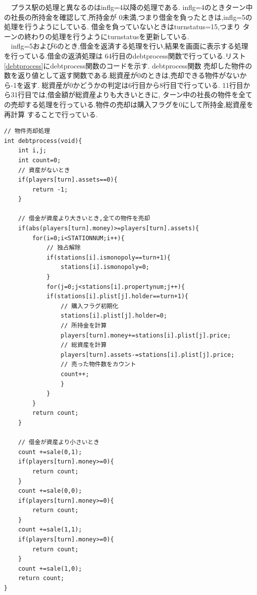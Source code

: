\documentclass[a4j]{jarticle}
\begin{document}
        　プラス駅の処理と異なるのはinflg=4以降の処理である. inflg=4のときターン中の社長の所持金を確認して,所持金が
        0未満,つまり借金を負ったときは,inflg=5の処理を行うようにしている. 借金を負っていないときはturnstatus=15,つまり
        ターンの終わりの処理を行うようにturnstatusを更新している.\\
        　inflg=5および6のとき,借金を返済する処理を行い,結果を画面に表示する処理を行っている.借金の返済処理は
        64行目のdebtprocess関数で行っている.リスト\ref{debtprocess}にdebtprocess関数のコードを示す. debtprocess関数
        売却した物件の数を返り値として返す関数である.総資産が0のときは,売却できる物件がないから-1を返す.
        総資産が0かどうかの判定は6行目から8行目で行っている. 11行目から31行目では,借金額が総資産よりも大きいときに,
        ターン中の社長の物件を全ての売却する処理を行っている.物件の売却は購入フラグを0にして所持金,総資産を再計算
        することで行っている. 
        \begin{lstlisting}[basicstyle=\ttfamily\footnotesize, frame=single,label=debtprocess,caption=debtprocess関数]
// 物件売却処理
int debtprocess(void){
    int i,j;
    int count=0;
    // 資産がないとき
    if(players[turn].assets==0){
        return -1;
    }

    // 借金が資産より大きいとき,全ての物件を売却
    if(abs(players[turn].money)>=players[turn].assets){
        for(i=0;i<STATIONNUM;i++){
            // 独占解除
            if(stations[i].ismonopoly==turn+1){
                stations[i].ismonopoly=0;
            }
            for(j=0;j<stations[i].propertynum;j++){
            if(stations[i].plist[j].holder==turn+1){
                // 購入フラグ初期化
                stations[i].plist[j].holder=0;
                // 所持金を計算
                players[turn].money+=stations[i].plist[j].price;
                // 総資産を計算
                players[turn].assets-=stations[i].plist[j].price;
                // 売った物件数をカウント
                count++;
                }
            }
        }  
        return count;
    }

    // 借金が資産より小さいとき
    count +=sale(0,1);
    if(players[turn].money>=0){
        return count;
    }
    count +=sale(0,0);
    if(players[turn].money>=0){
        return count;
    }
    count +=sale(1,1);
    if(players[turn].money>=0){
        return count;
    }
    count +=sale(1,0);
    return count;
}
        \end{lstlisting}
\end{document}
